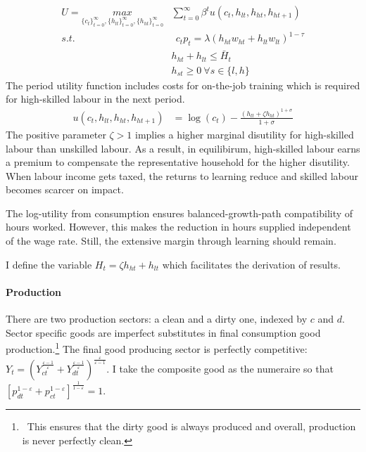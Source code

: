\begin{align}
U=\underset{\{c_{t}\}_{t=0}^{\infty}, \{h_{lt}\}_{t=0}^{\infty}, \{h_{ht}\}_{t=0}^{\infty}}{max}&
\sum_{t=0}^{\infty}\beta^t u(c_{t}, h_{lt}, h_{ht}, h_{ht+1})\\
s.t.& \ \ c_{t}p_{t}=%
\lambda \left(h_{ht}w_{ht}+h_{lt}w_{lt}\right)^{1-\tau}\\
\ & h_{ht}+h_{lt}\leq \bar{H}_t\\
\ & h_{st}\geq 0 \ \forall s\in \{l,h\}
\end{align}
The period utility function includes costs for on-the-job training which is required for high-skilled labour in the next period. 
\begin{align}
	u(c_{t}, h_{lt}, h_{ht}, h_{ht+1})&= %
	\log(c_t)-\frac{(h_{lt}+\zeta h_{ht})^{1+\sigma}}{1+\sigma}%
\end{align}
The positive parameter $\zeta>1$ implies a higher marginal disutility for high-skilled labour than unskilled labour. As a result, in equilibirum,  
high-skilled labour earns a premium to compensate the representative household for the higher disutility. When labour income gets taxed, the returns to learning reduce and skilled labour becomes scarcer on impact. 

The log-utility from consumption ensures balanced-growth-path compatibility of hours worked. However, this makes the reduction in hours supplied independent of the wage rate. Still, the extensive margin through learning should remain.

I define the variable $H_t=\zeta h_{ht}+h_{lt}$ which facilitates the derivation of results. 

\paragraph{Production}
There are two production sectors: a clean and a dirty one, indexed by $c$ and $d$. Sector specific goods are imperfect substitutes in final consumption good production.\footnote{\ This ensures that the dirty good is always produced and overall, production is never perfectly clean.}  
The final good producing sector is perfectly competitive:
$Y_t=\left(Y_{ct}^{\frac{\varepsilon-1}{\varepsilon}}+Y_{dt}^{\frac{\varepsilon-1}{\varepsilon}}\right)^\frac{\varepsilon}{\varepsilon-1}$. 
I take the composite good as the numeraire so that $\left[p_{dt}^{1-\varepsilon}+p_{ct}^{1-\varepsilon}\right]^{\frac{1}{1-\varepsilon}}=1$.


